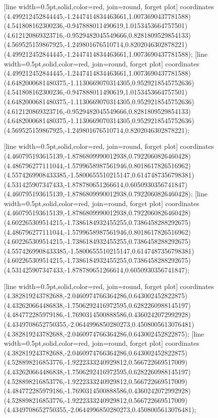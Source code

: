 [line width=0.5pt,solid,color=red, join=round, forget plot] coordinates {(4.499212452844445,-1.2447414834463661,1.0073690437781588) (4.541808162300236,-0.947888011490619,1.0153453664757501) (4.612120869323716,-0.9529482045549666,0.8281809529854133) (4.569525159867925,-1.249801676510714,0.8202046302878221) (4.499212452844445,-1.2447414834463661,1.0073690437781588)};
[line width=0.5pt,solid,color=red, join=round, forget plot] coordinates {(4.499212452844445,-1.2447414834463661,1.0073690437781588) (4.6482000681480375,-1.1130669070314305,0.9529218545752636) (4.541808162300236,-0.947888011490619,1.0153453664757501) (4.6482000681480375,-1.1130669070314305,0.9529218545752636) (4.612120869323716,-0.9529482045549666,0.8281809529854133) (4.6482000681480375,-1.1130669070314305,0.9529218545752636) (4.569525159867925,-1.249801676510714,0.8202046302878221)};

[line width=0.5pt,solid,color=red, join=round, forget plot] coordinates {(4.460795193615139,-1.8786809990012938,0.7922060826460428) (4.486796277111044,-1.5799658987561946,0.8018617826516962) (4.5574269908433385,-1.5800655510215147,0.6147487356798381) (4.531425907347433,-1.878780651266614,0.6050930356741847) (4.460795193615139,-1.8786809990012938,0.7922060826460428)};
[line width=0.5pt,solid,color=red, join=round, forget plot] coordinates {(4.460795193615139,-1.8786809990012938,0.7922060826460428) (4.602265309514215,-1.7386184932455255,0.7386458288292675) (4.486796277111044,-1.5799658987561946,0.8018617826516962) (4.602265309514215,-1.7386184932455255,0.7386458288292675) (4.5574269908433385,-1.5800655510215147,0.6147487356798381) (4.602265309514215,-1.7386184932455255,0.7386458288292675) (4.531425907347433,-1.878780651266614,0.6050930356741847)};

[line width=0.5pt,solid,color=red, join=round, forget plot] coordinates {(4.382819243782688,-2.0460974766364286,0.643002452822875) (4.432620664486838,-1.7506292416972595,0.6282260988145197) (4.484772285979186,-1.7690314500888586,0.4360242072992928) (4.4349708652750355,-2.0644996850280273,0.4508005613076481) (4.382819243782688,-2.0460974766364286,0.643002452822875)};
[line width=0.5pt,solid,color=red, join=round, forget plot] coordinates {(4.382819243782688,-2.0460974766364286,0.643002452822875) (4.528898216853776,-1.9222333240929812,0.566722669517009) (4.432620664486838,-1.7506292416972595,0.6282260988145197) (4.528898216853776,-1.9222333240929812,0.566722669517009) (4.484772285979186,-1.7690314500888586,0.4360242072992928) (4.528898216853776,-1.9222333240929812,0.566722669517009) (4.4349708652750355,-2.0644996850280273,0.4508005613076481)};

